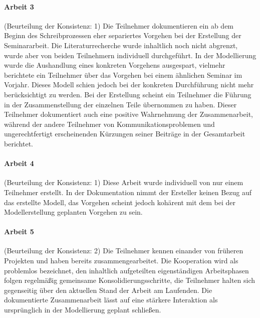 
\paragraph{Arbeit 3} %
\label{par:arbeit_3}

(Beurteilung der Konsistenz: 1) Die Teilnehmer dokumentieren ein ab dem Beginn des Schreibprozessen eher separiertes Vorgehen bei der Erstellung der Seminararbeit. Die Literaturrecherche wurde inhaltlich noch nicht abgrenzt, wurde aber von beiden Teilnehmern individuell durchgeführt. In der Modellierung wurde die Aushandlung eines konkreten Vorgehens ausgespart, vielmehr berichtete ein Teilnehmer über das Vorgehen bei einem ähnlichen Seminar im Vorjahr. Dieses Modell schien jedoch bei der konkreten Durchführung nicht mehr berücksichtigt zu werden. Bei der Erstellung scheint ein Teilnehmer die Führung in der Zusammenstellung der einzelnen Teile übernommen zu haben. Dieser Teilnehmer dokumentiert auch eine positive Wahrnehmung der Zusammenarbeit, während der andere Teilnehmer von Kommunikationsproblemen und ungerechtfertigt erscheinenden Kürzungen seiner Beiträge in der Gesamtarbeit berichtet. 

\paragraph{Arbeit 4} %
\label{par:arbeit_4}

(Beurteilung der Konsistenz: 1) Diese Arbeit wurde individuell von nur einem Teilnehmer erstellt. In der Dokumentation nimmt der Ersteller keinen Bezug auf das erstellte Modell, das Vorgehen scheint jedoch kohärent mit dem bei der Modellerstellung geplanten Vorgehen zu sein.

\paragraph{Arbeit 5} %
\label{par:arbeit_5}

(Beurteilung der Konsistenz: 2) Die Teilnehmer kennen einander von früheren Projekten und haben bereits zusammengearbeitet. Die Kooperation wird als problemlos bezeichnet, den inhaltlich aufgeteilten eigenständigen Arbeitsphasen folgen regelmäßig gemeinsame Konsolidierungsschritte, die Teilnehmer halten sich gegenseitig über den aktuellen Stand der Arbeit am Laufenden. Die dokumentierte Zusammenarbeit lässt auf eine stärkere Interaktion als ursprünglich in der Modellierung geplant schließen.

